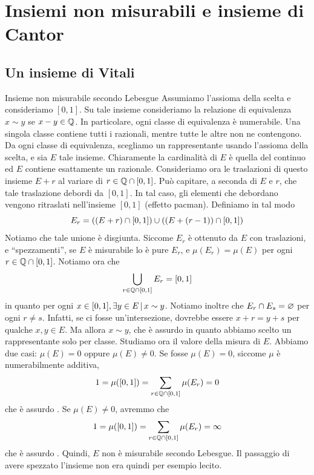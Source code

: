 \documentclass[a4paper]{article}
\begin{document}
\section{Insiemi non misurabili e insieme di Cantor}

\subsection{Un insieme di Vitali}

\begin{radioactive}
\begin{snippetexample}{Insieme non misurabile secondo Lebesgue}
    Assumiamo l'assioma della scelta e consideriamo \([0,1]\).
    Su tale insieme consideriamo la relazione di equivalenza
    \(x\sim y\) se \(x-y \in \mathbb{Q}\).
    In particolare, ogni classe di equivalenza è numerabile.
    Una singola classe contiene tutti i razionali, mentre tutte le altre non ne contengono.
    Da ogni classe di equivalenza, scegliamo un rappresentante
    usando l'assioma della scelta, e sia \(E\) tale insieme.
    Chiaramente la cardinalità di \(E\)
    è quella del continuo ed \(E\) contiene esattamente un razionale.
    Consideriamo ora le traslazioni di questo insieme
    \(E+r\) al variare di \(r \in \mathbb{Q}\cap[0,1]\).
    Può capitare, a seconda di \(E\) e \(r\), che tale traslazione debordi da \([0,1]\).
    In tal caso, gli elementi che debordano vengono ritraslati
    nell'insieme \([0,1]\) (effetto pacman). Definiamo in tal modo
    \[
        E_r = \left(
            (E + r) \cap[0,1]
        \right)
        \cup \left(
            (E + (r-1)) \cap [0,1]
        \right)
    \]
    Notiamo che tale unione è disgiunta.
    Siccome \(E_r\) è ottenuto da \(E\) con traslazioni,
    e ``spezzamenti'', se \(E\) è misurabile lo è pure \(E_r\),
    e \(\mu(E_r) = \mu(E)\) per ogni \(r \in \mathbb{Q}\cap[0,1]\).
    Notiamo ora che \[
        \bigcup_{r \in \mathbb{Q}\cap[0,1]} E_r = [0,1]
    \]
    in quanto per ogni \(x \in [0,1], \exists y \in E \,|\, x \sim y\).
    Notiamo inoltre che \(E_r \cap E_s = \varnothing\)
    per ogni \(r \neq s\).
    Infatti, se ci fosse un'intersezione, dovrebbe essere \(x + r = y + s\)
    per qualche \(x,y \in E\). Ma allora \(x \sim y\), che è assurdo in quanto
    abbiamo scelto un rappresentante solo per classe.
    Studiamo ora il valore della misura di \(E\).
    Abbiamo due casi: \(\mu(E) = 0\) oppure \(\mu(E) \neq 0\).
    Se fosse \(\mu(E) = 0\), siccome \(\mu\) è numerabilmente additiva,
    \[
        1 = \mu([0,1])
        = \sum_{r \in \mathbb{Q}\cap[0,1]} \mu(E_r) = 0
    \]
    che è assurdo \lightning.
    Se \(\mu(E) \neq 0\), avremmo che \[
        1 = \mu([0,1])
        = \sum_{r \in \mathbb{Q}\cap[0,1]} \mu(E_r) = \infty
    \]
    che è assurdo \lightning.
    Quindi, \(E\) non è misurabile secondo Lebesgue.
    Il passaggio di avere spezzato l'insieme non era quindi per esempio lecito.
\end{snippetexample}
\end{radioactive}
\end{document}
